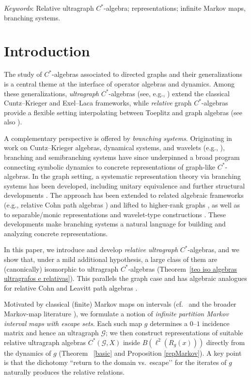\documentclass[12pt, reqno]{amsart}
\theoremstyle{definition}
\theoremstyle{remark}
\numberwithin{equation}{section}
\begin{document}
{\it Keywords}: Relative ultragraph $C^*$-algebra; representations; infinite Markov maps, branching systems.



\section{Introduction}

The study of $C^*$-algebras associated to directed graphs and their generalizations is a central theme at the interface of operator algebras and dynamics. Among these generalizations, \emph{ultragraph} $C^*$-algebras (see, e.g., \cite{Tom3,Katsura, GilleseDaniel}) extend the classical Cuntz--Krieger and Exel--Laca frameworks, while \emph{relative} graph $C^*$-algebras \cite{Tom} provide a flexible setting interpolating between Toeplitz and graph algebras (see also \cite{CarlsenandLarsen, Sims}). 

A complementary perspective is offered by \emph{branching systems}. Originating in work on Cuntz–Krieger algebras, dynamical systems, and wavelets (e.g., \cite{AK, BJ,DuPalle,marcolli}), branching and semibranching systems have since underpinned a broad program connecting symbolic dynamics to concrete representations of graph-like $C^*$-algebras. In the graph setting, a systematic representation theory via branching systems has been developed, including unitary equivalence \cite{Daniel} and further structural developments \cite{DDinicio, GLR2016CMB}. The approach has been extended to related algebraic frameworks (e.g., relative Cohn path algebras \cite{danielcristobal, DDseparated}) and lifted to higher-rank graphs \cite{GLR2018GMJ}, as well as to separable/monic representations and wavelet-type constructions \cite{FGKP2016,FGJKP2020}. These developments make branching systems a natural language for building and analyzing concrete representations.

In this paper, we introduce and develop \emph{relative ultragraph} $C^*$-algebras, and we show that, under a mild additional hypothesis, a large class of them are (canonically) isomorphic to ultragraph $C^*$-algebras (Theorem~\ref{teo iso algebras ultragrafos e relativas}). This parallels the graph case \cite{Tom} and has algebraic analogues for relative Cohn and Leavitt path algebras \cite{Livroversaoalgebrica}. 

Motivated by classical (finite) Markov maps on intervals (cf.\ \cite{CMP,RMP5,RMP10} and the broader Markov-map literature \cite{Rufus,OutroMarkov}), we formulate a notion of \emph{infinite partition Markov interval maps with escape sets}. Each such map $g$ determines a $0$--$1$ incidence matrix and hence an ultragraph $\mathcal{G}$; we then construct representations of suitable relative ultragraph algebras $C^*(\mathcal{G},X)$ inside $B(\ell^2(R_g(x)))$ directly from the dynamics of $g$ (Theorem ~\ref{basic} and Proposition \ref{repMarkov}). A key point is that the dichotomy “return to the domain vs.\ escape’’ for the iterates of $g$ naturally produces the relative relations. 
\end{document}
